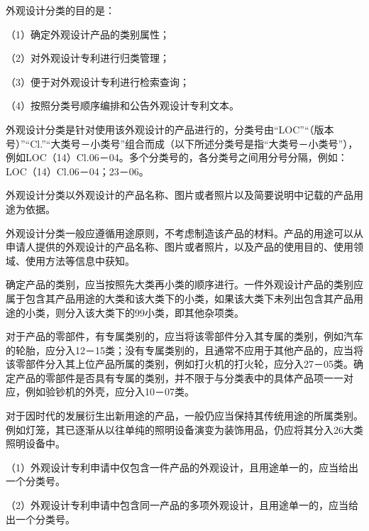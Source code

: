 外观设计分类的目的是：

{\setlength{\parindent}{17.1bp}（1）确定外观设计产品的类别属性；\par}

{\setlength{\parindent}{17.1bp}（2）对外观设计专利进行归类管理；\par}

{\setlength{\parindent}{17.1bp}（3）便于对外观设计专利进行检索查询；\par}

{\setlength{\parindent}{17.1bp}（4）按照分类号顺序编排和公告外观设计专利文本。\par}

外观设计分类是针对使用该外观设计的产品进行的，分类号由“LOC”“（版本号）”“Cl.”“大类号－小类号”组合而成（以下所述分类号是指“大类号－小类号”），例如LOC（14）Cl.06－04。多个分类号的，各分类号之间用分号分隔，例如：LOC（14）Cl.06－04；23－06。

外观设计分类以外观设计的产品名称、图片或者照片以及简要说明中记载的产品用途为依据。

外观设计分类一般应遵循用途原则，不考虑制造该产品的材料。产品的用途可以从申请人提供的外观设计的产品名称、图片或者照片，以及产品的使用目的、使用领域、使用方法等信息中获知。

确定产品的类别，应当按照先大类再小类的顺序进行。一件外观设计产品的类别应属于包含其产品用途的大类和该大类下的小类，如果该大类下未列出包含其产品用途的小类，则分入该大类下的99小类，即其他杂项类。

对于产品的零部件，有专属类别的，应当将该零部件分入其专属的类别，例如汽车的轮胎，应分入12－15类；没有专属类别的，且通常不应用于其他产品的，应当将该零部件分入其上位产品所属的类别，例如打火机的打火轮，应分入27－05类。确定产品的零部件是否具有专属的类别，并不限于与分类表中的具体产品项一一对应，例如验钞机的外壳，应分入10－07类。

对于因时代的发展衍生出新用途的产品，一般仍应当保持其传统用途的所属类别。例如灯笼，其已逐渐从以往单纯的照明设备演变为装饰用品，仍应将其分入26大类照明设备中。

{\setlength{\parindent}{17.1bp}（1）外观设计专利申请中仅包含一件产品的外观设计，且用途单一的，应当给出一个分类号。\par}

{\setlength{\parindent}{17.1bp}（2）外观设计专利申请中包含同一产品的多项外观设计，且用途单一的，应当给出一个分类号。\par}

